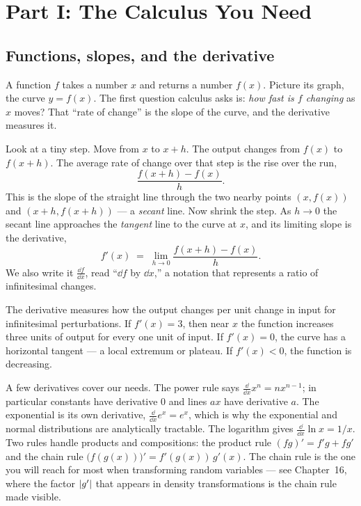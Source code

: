 \section{Part I: The Calculus You Need}
\label{chAcla:calc-intro}

\subsection{Functions, slopes, and the derivative}
\label{chAcla:derivative}

A function $f$ takes a number $x$ and returns a number $f(x)$.
Picture its graph, the curve $y=f(x)$. The first question calculus asks is: \emph{how fast is $f$
changing} as $x$ moves? That ``rate of change'' is the slope of the curve, and the derivative measures
it.

Look at a tiny step. Move from $x$ to $x+h$. The output changes from $f(x)$ to
$f(x+h)$. The average rate of change over that step is the rise over the run,
\[
  \frac{f(x+h)-f(x)}{h}.
\]
This is the slope of the straight line through the two nearby points $(x,f(x))$ and $(x+h, f(x+h))$
--- a \emph{secant} line. Now shrink the step. As $h\to 0$ the secant line approaches the
\emph{tangent} line to the curve at $x$, and its limiting slope is the derivative,
\[
  f'(x) \;=\; \lim_{h\to 0}\frac{f(x+h)-f(x)}{h}.
\]
We also write it $\frac{\dd f}{\dd x}$, read ``$\dd f$ by $\dd x$,'' a notation that represents
a ratio of infinitesimal changes.

\begin{intuitionbox}
The derivative measures how the output changes per unit change in input for infinitesimal
perturbations. If $f'(x)=3$, then near $x$ the function increases three units of output for every
one unit of input. If $f'(x)=0$, the curve has a horizontal tangent --- a local extremum or
plateau. If $f'(x)<0$, the function is decreasing.
\end{intuitionbox}

A few derivatives cover our needs. The power rule says
$\frac{\dd}{\dd x}x^n = n x^{n-1}$; in particular constants have derivative $0$ and lines $ax$ have
derivative $a$. The exponential is its own derivative, $\frac{\dd}{\dd x}e^{x}=e^{x}$, which is
why the exponential and normal distributions are analytically tractable. The logarithm
gives $\frac{\dd}{\dd x}\ln x = 1/x$. Two rules handle products and compositions: the product rule
$(fg)'=f'g+fg'$ and the chain rule $\big(f(g(x))\big)' = f'(g(x))\,g'(x)$. The chain rule is the one
you will reach for most when transforming random variables --- see Chapter~16,
where the factor $\lvert g'\rvert$ that appears in density transformations is the chain rule made visible.

